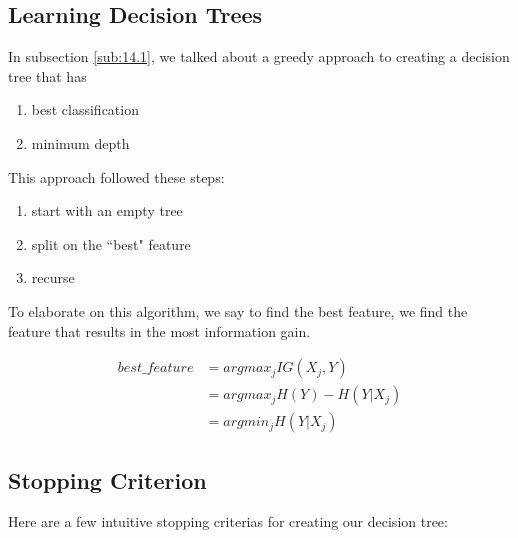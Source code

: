 \documentclass[12pt]{article}
\begin{document}
\subsection{Learning Decision Trees}

In subsection \ref{sub:14.1}, we talked about a greedy approach to creating a decision tree that has 

\begin{enumerate}
	\item best classification
	\item minimum depth
\end{enumerate}

This approach followed these steps:

\begin{enumerate}
	\item start with an empty tree
	\item split on the ``best" feature
	\item recurse
\end{enumerate}

To elaborate on this algorithm, we say to find the best feature, we find the feature that results in the most information gain.

\[ 
	\begin{aligned}
		best\_feature &= arg max_j IG(X_j, Y)\\
									&= argmax_jH(Y) - H(Y|X_j)\\
									&= argmin_jH(Y|X_j)  
	\end{aligned}
\]

\subsection{Stopping Criterion}

Here are a few intuitive stopping criterias for creating our decision tree:
\end{document}

